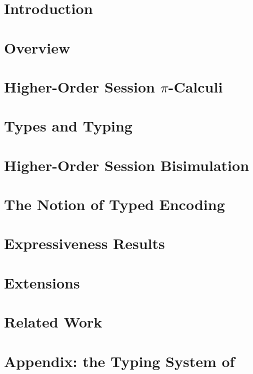 \documentclass[preprint,nocopyrightspace]{sigplanconf}
\begin{document}
%

\section{Introduction}
%

\section{Overview} %
%

\section{Higher-Order Session $\pi$-Calculi}
\label{sec:calculus}


\section{Types and Typing}
%

\section{Higher-Order Session Bisimulation}
%

\section{The Notion of Typed Encoding}
\label{s:expr}


\section{Expressiveness Results}
\label{sec:positive}




\section{Extensions}
\label{sec:extension}


\section{Related Work}
\label{sec:relwork}




%

{}

\newpage
\appendix 
\section{Appendix: the Typing System of \HOp}
\label{app:types}

\end{document}
